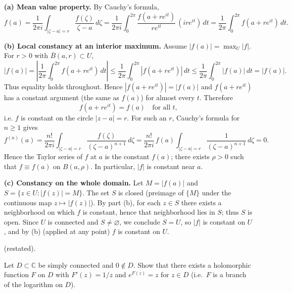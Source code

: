 \begin{solution}
\par\medskip\noindent\textbf{(a) Mean value property.}\quad 
By Cauchy’s formula,
\[
f(a)=\frac{1}{2\pi i}\int_{|\zeta-a|=r}\frac{f(\zeta)}{\zeta-a}\,d\zeta
=\frac{1}{2\pi i}\int_{0}^{2\pi}\frac{f(a+re^{it})}{re^{it}}\,(ire^{it})\,dt
=\frac{1}{2\pi}\int_{0}^{2\pi} f(a+re^{it})\,dt.
\]

\par\medskip\noindent\textbf{(b) Local constancy at an interior maximum.}\quad 
Assume $|f(a)|=\max_{U}|f|$. For $r>0$ with $\overline{B}(a,r)\subset U$,
\[
|f(a)|
=\left|\frac{1}{2\pi}\int_{0}^{2\pi} f(a+re^{it})\,dt\right|
\le \frac{1}{2\pi}\int_{0}^{2\pi}|f(a+re^{it})|\,dt
\le \frac{1}{2\pi}\int_{0}^{2\pi}|f(a)|\,dt
=|f(a)|.
\]
Thus equality holds throughout. Hence $|f(a+re^{it})|=|f(a)|$ and $f(a+re^{it})$ has a constant argument (the same as $f(a)$) for almost every $t$. Therefore
\[
f(a+re^{it})=f(a)\quad\text{for all }t,
\]
i.e. $f$ is constant on the circle $|z-a|=r$. For such an $r$, Cauchy’s formula for $n\ge1$ gives
\[
f^{(n)}(a)=\frac{n!}{2\pi i}\int_{|\zeta-a|=r}\frac{f(\zeta)}{(\zeta-a)^{n+1}}\,d\zeta
=\frac{n!}{2\pi i}\,f(a)\int_{|\zeta-a|=r}\frac{1}{(\zeta-a)^{n+1}}\,d\zeta=0.
\]
Hence the Taylor series of $f$ at $a$ is the constant $f(a)$; there exists $\rho>0$ such that $f\equiv f(a)$ on $B(a,\rho)$. In particular, $|f|$ is constant near $a$.

\par\medskip\noindent\textbf{(c) Constancy on the whole domain.}\quad 
Let $M=|f(a)|$ and $S=\{z\in U: |f(z)|=M\}$. The set $S$ is closed (preimage of $\{M\}$ under the continuous map $z\mapsto|f(z)|$). By part (b), for each $z\in S$ there exists a neighborhood on which $f$ is constant, hence that neighborhood lies in $S$; thus $S$ is open. Since $U$ is connected and $S\neq\varnothing$, we conclude $S=U$, so $|f|$ is constant on $U$, and by (b) (applied at any point) $f$ is constant on $U$.
\end{solution}

\begin{problem}[CP-IV-0092]
\label{prob:cp-iv-0092}
(restated).

Let $D\subset\mathbb C$ be simply connected and $0\notin D$.
Show that there exists a holomorphic function $F$ on $D$ with $F'(z)=1/z$ and $e^{F(z)}=z$ for $z\in D$
(i.e.\ $F$ is a branch of the logarithm on $D$).

\medskip
\end{problem}

